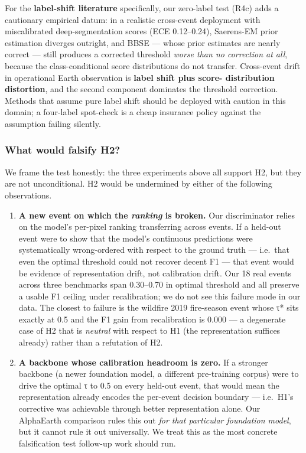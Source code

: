 For the \textbf{label-shift literature} specifically, our zero-label test
(R4c) adds a cautionary empirical datum: in a realistic cross-event
deployment with miscalibrated deep-segmentation scores (ECE
0.12--0.24), Saerens-EM prior estimation diverges outright, and BBSE ---
whose prior estimates are nearly correct --- still produces a corrected
threshold \emph{worse than no correction at all}, because the
class-conditional score distributions do not transfer. Cross-event
drift in operational Earth observation is \textbf{label shift plus score-
distribution distortion}, and the second component dominates the
threshold correction. Methods that assume pure label shift should be
deployed with caution in this domain; a four-label spot-check is a
cheap insurance policy against the assumption failing silently.

\subsubsection{What would falsify H2?}\label{what-would-falsify-h2}

We frame the test honestly: the three experiments above all support H2,
but they are not unconditional. H2 would be undermined by either of
the following observations.

\begin{enumerate}
\def\labelenumi{(\roman{enumi})}
\item
  \textbf{A new event on which the \emph{ranking} is broken.} Our discriminator
  relies on the model's per-pixel ranking transferring across events.
  If a held-out event were to show that the model's continuous predictions
  were systematically wrong-ordered with respect to the ground truth ---
  i.e.~that even the optimal threshold could not recover decent F1 --- that
  event would be evidence of representation drift, not calibration drift.
  Our 18 real events across three benchmarks span 0.30--0.70 in optimal
  threshold and all preserve a usable F1 ceiling under recalibration; we
  do not see this failure mode in our data. The closest to failure is
  the wildfire 2019 fire-season event whose τ* sits exactly at 0.5 and
  the F1 gain from recalibration is 0.000 --- a degenerate case of H2 that
  is \emph{neutral} with respect to H1 (the representation suffices already)
  rather than a refutation of H2.
\item
  \textbf{A backbone whose calibration headroom is zero.} If a stronger
  backbone (a newer foundation model, a different pre-training corpus)
  were to drive the optimal τ to 0.5 on every held-out event, that would
  mean the representation already encodes the per-event decision
  boundary --- i.e.~H1's corrective was achievable through better
  representation alone. Our AlphaEarth comparison rules this out \emph{for
  that particular foundation model}, but it cannot rule it out
  universally. We treat this as the most concrete falsification test
  follow-up work should run.
\end{enumerate}

